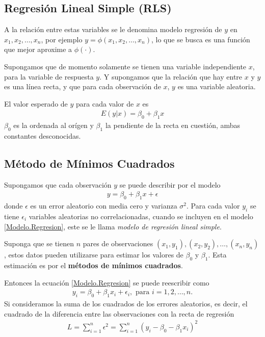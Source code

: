 \begin{itemize}
\begin{enumerate}
\subsection*{Regresi\'on Lineal Simple (RLS)}
A la relaci\'on entre estas variables se le denomina modelo regresi\'on de $y$ en $x_{1},x_{2},\ldots,x_{n}$, por ejemplo $y=\phi\left(x_{1},x_{2},\ldots,x_{n}\right)$, lo que se busca es una funci\'on que mejor aproxime a $\phi\left(\cdot\right)$.

Supongamos que de momento solamente se tienen una variable independiente $x$, para la variable de respuesta $y$. Y supongamos que la relaci\'on que hay entre $x$ y $y$ es una l\'inea recta, y que para cada observaci\'on de $x$, $y$ es una variable aleatoria.

El valor esperado de $y$ para cada valor de $x$ es
\begin{eqnarray}
E\left(y|x\right)=\beta_{0}+\beta_{1}x
\end{eqnarray}
$\beta_{0}$ es la ordenada al or\'igen y $\beta_{1}$ la pendiente de la recta en cuesti\'on, ambas constantes desconocidas. 

\subsection*{M\'etodo de M\'inimos Cuadrados}
Supongamos que cada observaci\'on $y$ se puede describir por el modelo
\begin{eqnarray}\label{Modelo.Regresion}
y=\beta_{0}+\beta_{1}x+\epsilon
\end{eqnarray}
donde $\epsilon$ es un error aleatorio con media cero y varianza $\sigma^{2}$. Para cada valor $y_{i}$ se tiene $\epsilon_{i}$ variables aleatorias no correlacionadas, cuando se incluyen en el modelo \ref{Modelo.Regresion}, este se le llama \textit{modelo de regresi\'on lineal simple}.


Suponga que se tienen $n$ pares de observaciones $\left(x_{1},y_{1}\right),\left(x_{2},y_{2}\right),\ldots,\left(x_{n},y_{n}\right)$, estos datos pueden utilizarse para estimar los valores de $\beta_{0}$ y $\beta_{1}$. Esta estimaci\'on es por el \textbf{m\'etodos de m\'inimos cuadrados}.

Entonces la ecuaci\'on \ref{Modelo.Regresion} se puede reescribir como
\begin{eqnarray}\label{Modelo.Regresion.dos}
y_{i}=\beta_{0}+\beta_{1}x_{i}+\epsilon_{i},\textrm{ para }i=1,2,\ldots,n.
\end{eqnarray}
Si consideramos la suma de los cuadrados de los errores aleatorios, es decir, el cuadrado de la diferencia entre las observaciones con la recta de regresi\'on
\begin{eqnarray}
L=\sum_{i=1}^{n}\epsilon^{2}=\sum_{i=1}^{n}\left(y_{i}-\beta_{0}-\beta_{1}x_{i}\right)^{2}
\end{eqnarray}


\end{enumerate}
\end{itemize}
